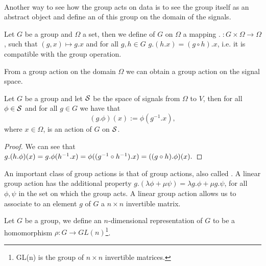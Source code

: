 \documentclass[../3.tex]{subfiles}
\begin{document}

    \hfill \\
    Another way to see how the group acts on data is to see the group itself as an abstract object and define an  of this group on the domain
    of the signals.

    \begin{defn}
        Let $G$ be a group and $\Omega$ a set, then we define  of $G$ on $\Omega$ a mapping $. \; : G \times \Omega \to \Omega$, such that
        $(g,x) \mapsto g.x$ and for all $g,h \in G$ $g.(h.x) = (g \circ h).x$, i.e. it is compatible with the group operation.
    \end{defn}

    From a group action on the domain $\Omega$ we can obtain a group action on the signal space.

    \begin{prop}
        Let $G$ be a group and let $\mathcal{S}$ be the space of signals from $\Omega$ to $V$, then for all $\phi \in \mathcal{S}$ and for all $g \in G$ we have that
        \[ (g.\phi)(x) := \phi(g^{-1}.x), \]
        where $x \in \Omega$, is an action of $G$ on $\mathcal{S}$.
    \end{prop}
    \begin{proof}
        We can see that $g.(h.\phi)(x) = g.\phi(h^{-1}.x) = \phi((g^{-1} \circ h^{-1}).x) = ((g \circ h).\phi)(x). \qedhere$
    \end{proof}

    An important class of group actions is that of  group actions, also called .
    A linear group action has the additional property $g.(\lambda \phi + \mu \psi) = \lambda g.\phi + \mu g.\psi$, for all $\phi,\psi$ in the set
    on which the group acts. A linear group action allows us to associate to an element $g$ of $G$ a $n \times n$ invertible matrix.

    \begin{defn}
        Let $G$ be a group, we define an $n$-dimensional representation of $G$ to be a homomorphism $\rho : G \to GL(n)$\footnote{GL(n) is the group of $n \times n$ invertible matrices.}.
    \end{defn}
\end{document}
